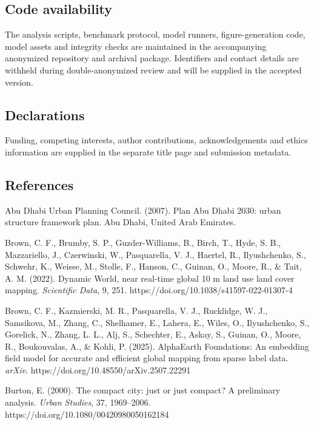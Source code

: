\subsection{Code availability}\label{code-availability}

The analysis scripts, benchmark protocol, model runners,
figure-generation code, model assets and integrity checks are maintained
in the accompanying anonymized repository and archival package.
Identifiers and contact details are withheld during double-anonymized
review and will be supplied in the accepted version.

\subsection{Declarations}\label{declarations}

Funding, competing interests, author contributions, acknowledgements and
ethics information are supplied in the separate title page and
submission metadata.

\subsection{References}\label{references}

Abu Dhabi Urban Planning Council. (2007). Plan Abu Dhabi 2030: urban
structure framework plan. Abu Dhabi, United Arab Emirates.

Brown, C. F., Brumby, S. P., Guzder-Williams, B., Birch, T., Hyde, S.
B., Mazzariello, J., Czerwinski, W., Pasquarella, V. J., Haertel, R.,
Ilyushchenko, S., Schwehr, K., Weisse, M., Stolle, F., Hanson, C.,
Guinan, O., Moore, R., \& Tait, A. M. (2022). Dynamic World, near
real-time global 10 m land use land cover mapping. \emph{Scientific
Data}, 9, 251. https://doi.org/10.1038/s41597-022-01307-4

Brown, C. F., Kazmierski, M. R., Pasquarella, V. J., Rucklidge, W. J.,
Samsikova, M., Zhang, C., Shelhamer, E., Lahera, E., Wiles, O.,
Ilyushchenko, S., Gorelick, N., Zhang, L. L., Alj, S., Schechter, E.,
Askay, S., Guinan, O., Moore, R., Boukouvalas, A., \& Kohli, P. (2025).
AlphaEarth Foundations: An embedding field model for accurate and
efficient global mapping from sparse label data. \emph{arXiv}.
https://doi.org/10.48550/arXiv.2507.22291

Burton, E. (2000). The compact city: just or just compact? A preliminary
analysis. \emph{Urban Studies}, 37, 1969--2006.
https://doi.org/10.1080/00420980050162184

